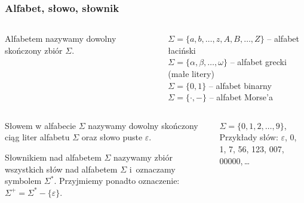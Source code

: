 \documentclass[8pt]{beamer}
\begin{document}

\begin{frame}[t]
\frametitle{Alfabet, słowo, słownik} 
\begin{columns}
\begin{alertblock}{}
\alert{Alfabetem} nazywamy dowolny skończony zbiór $\Sigma$.
\end{alertblock}

\begin{exampleblock}{}
$\Sigma = \{a,b,\dots,z,A,B,\dots,Z\}$ -- alfabet łaciński\\
$\Sigma = \{\alpha,\beta,\dots,\omega\}$ -- alfabet grecki (małe litery)\\
$\Sigma = \{0,1\}$ -- alfabet binarny\\
$\Sigma = \{\cdot,-\}$ -- alfabet Morse'a
\end{exampleblock}
\end{columns}
\pause
\begin{columns}
\begin{alertblock}{}
\alert{Słowem} w alfabecie $\Sigma$ nazywamy dowolny skończony ciąg liter alfabetu $\Sigma$ oraz \alert{słowo puste} $\varepsilon$. 

\alert{Słownikiem nad alfabetem} $\Sigma$ nazywamy zbiór wszystkich słów nad alfabetem $\Sigma$ i~oznaczamy symbolem $\Sigma^{*}$. Przyjmiemy ponadto oznaczenie: $\Sigma^{+} = \Sigma^{*} - \{\varepsilon\}$.
\end{alertblock}

\begin{exampleblock}{}
$\Sigma = \{0,1,2,\dots,9\}$, Przykłady słów: $\varepsilon$, 0, 1, 7, 56, 123, 007, 00000,\,\dots
\end{exampleblock}

\end{columns}

\end{frame}
\end{document}
